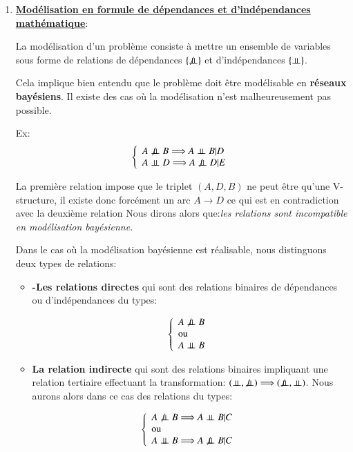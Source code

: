 \documentclass[a4paper]{article}
\begin{document}
\begin{enumerate}


\item  \underline{\textbf{Modélisation en formule de dépendances et d'indépendances mathématique}}: {\\}


La modélisation d'un problème consiste à mettre un ensemble de variables sous forme de relations de dépendances $\{\not\perp\!\!\!\perp \}$ et d'indépendances $\{\perp\!\!\!\perp\}$.

Cela implique bien entendu que le problème doit être modélisable en \textbf{réseaux bayésiens}.
Il existe des cas où la modélisation n'est malheureusement pas possible.

Ex:
$$\left\lbrace 
\begin{array}{lcl} 
A\not\ci B \Longrightarrow A\ci B|D\\
A\ci D \Longrightarrow  A\not\ci D|E\\
\end{array}\right.$$

La première relation impose que le triplet $(A,D,B)$ ne peut être qu'une V-structure, il existe donc forcément un arc $A \longrightarrow D$ ce qui est en contradiction avec la deuxième relation
Nous dirons alors que:\textit{les relations sont incompatible en modélisation bayésienne.} 

Dans le cas où la modélisation bayésienne est réalisable, nous distinguons deux types de relations:
\begin{itemize}
\item \textbf{-Les relations directes} qui sont des relations binaires de dépendances ou d'indépendances du types:

\[
\left\lbrace 
\begin{array}{lcl} 
A\not\perp\!\!\!\perp B\\ 
\text{ou}\\ 
A\perp\!\!\!\perp B
\end{array}\right.
\]

\item \textbf{La relation indirecte} qui sont des relations binaires impliquant une relation tertiaire effectuant la transformation: $(\ci,\not\ci)\Longrightarrow (\not\ci,\ci)$.
Nous aurons alors dans ce cas des relations du types:

\[
\left\lbrace 
\begin{array}{lcl} 
A\not\ci B \Longrightarrow A\ci B|C\\  
\text{ou} \\ 
A\ci B \Longrightarrow A\not\ci B|C 
\end{array}\right.
\]
\end{itemize}



\end{enumerate}
\end{document}
